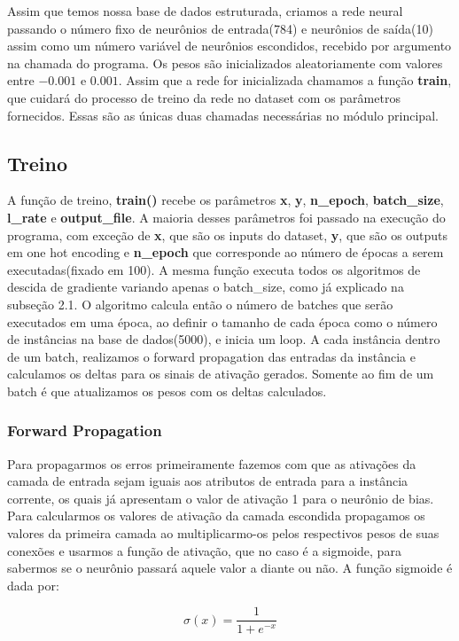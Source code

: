 \documentclass[a4paper, 11pt]{article}
\begin{document}
Assim que temos nossa base de dados estruturada, criamos a rede neural passando o número fixo de neurônios de entrada(784) e neurônios de saída(10) assim como um número variável de neurônios escondidos, recebido por argumento na chamada do programa. Os pesos são inicializados aleatoriamente com valores entre $-0.001$ e $0.001$. Assim que a rede for inicializada chamamos a função \textbf{train}, que cuidará do processo de treino da rede no dataset com os parâmetros fornecidos. Essas são as únicas duas chamadas necessárias no módulo principal.

\subsection{Treino}
A função de treino, \textbf{train()} recebe os parâmetros \textbf{x}, \textbf{y}, \textbf{n\_epoch}, \textbf{batch\_size}, \textbf{l\_rate} e \textbf{output\_file}. A maioria desses parâmetros foi passado na execução do programa, com exceção de \textbf{x}, que são os inputs do dataset, \textbf{y}, que são os outputs em one hot encoding e \textbf{n\_epoch} que corresponde ao número de épocas a serem executadas(fixado em 100). A mesma função executa todos os algoritmos de descida de gradiente variando apenas o batch\_size, como já explicado na subseção 2.1. O algoritmo calcula então o número de batches que serão executados em uma época, ao definir o tamanho de cada época como o número de instâncias na base de dados(5000), e inicia um loop. A cada instância dentro de um batch, realizamos o forward propagation das entradas da instância e calculamos os deltas para os sinais de ativação gerados. Somente ao fim de um batch  é que atualizamos os pesos com os deltas calculados.
\subsubsection{Forward Propagation}
Para propagarmos os erros primeiramente fazemos com que as ativações da camada de entrada sejam iguais aos atributos de entrada para a instância corrente, os quais já apresentam o valor de ativação 1 para o neurônio de bias. Para calcularmos os valores de ativação da camada escondida propagamos os valores da primeira camada ao multiplicarmo-os pelos respectivos pesos de suas conexões e usarmos a função de ativação, que no caso é a sigmoide, para sabermos se o neurônio passará aquele valor a diante ou não. A função sigmoide é dada por:

\begin{equation*}
\sigma(x) = \frac{1}{1 + e^{-x}}
\end{equation*}
\end{document}
